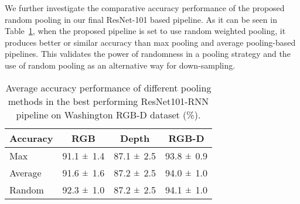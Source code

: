 We further investigate the comparative accuracy performance of the proposed random pooling in our final ResNet-101 based pipeline. As it can be seen in Table~\ref{table:poolingComparison}, when the proposed pipeline is set to use random weighted pooling, it produces better or similar accuracy than max pooling and average pooling-based pipelines. This validates the power of randomness in a pooling strategy and the use of random pooling as an alternative way for down-sampling.
\begin{table}[!h]
	\caption{Average accuracy performance of different pooling methods in the best performing ResNet101-RNN pipeline on Washington RGB-D dataset (\%).}
	\begin{center}
		\setlength{\tabcolsep}{0.9em} \def\arraystretch{1.2}
		\begin{adjustbox}{width=0.75\columnwidth}
			\begin{tabular}{ lccc }
				\hline
				Accuracy			& RGB 								& Depth 							& RGB-D \\ \hline \hline
				Max   				& 91.1 $\pm\hfil$ 1.4 				& 87.1 $\pm\hfil$ 2.5 	 			& 93.8 $\pm\hfil$ 0.9 		\\ Average    			& 91.6 $\pm\hfil$ 1.6 				& 87.2 $\pm\hfil$ 2.5 	 			& 94.0 $\pm\hfil$ 1.0 		\\ Random   			& 92.3 $\pm\hfil$ 1.0 				& 87.2 $\pm\hfil$ 2.5 	 			& 94.1 $\pm\hfil$ 1.0 		\\ \hline
			\end{tabular}
		\end{adjustbox}
		\label{table:poolingComparison}
	\end{center}
\end{table}

